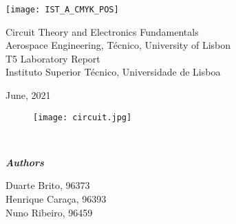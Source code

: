 
\thispagestyle {empty}



\texttt{[image: IST\_A\_CMYK\_POS]}

\begin{center}
%



\vspace{1cm}
{\FontLb Circuit Theory and Electronics Fundamentals} \\ %
\vspace{1cm}
{\FontSn Aerospace Engineering, Técnico, University of Lisbon} \\ %
\vspace{1cm}
{\FontSn T5 Laboratory Report} \\
\vspace{1cm}
{\FontSn Instituto Superior Técnico, Universidade de Lisboa} \\ %
\vspace{1cm}

{\FontSn June, 2021} \\ %
\vspace{2cm}

\begin{figure}[h!] \centering
	\texttt{[image: circuit.jpg]}
	\label{fig:capa}
\end{figure}

\vspace{2cm}

\textbf{\emph{}\\[0.06in]}

\textbf{\emph{Authors}\\[0.05in]}

Duarte Brito, 96373\\
Henrique Caraça, 96393\\
Nuno Ribeiro, 96459\\

\vspace{2cm}



\end{center}

